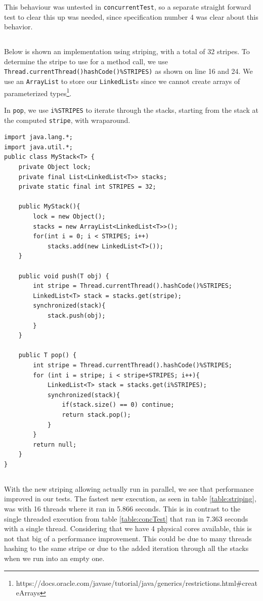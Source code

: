 \documentclass[a5paper]{article}
\begin{document}
This behaviour was untested in \texttt{concurrentTest}, so a separate straight forward test to clear this up was needed, since specification number 4 was clear about this behavior.

\subsection{}\label{sec:striping}
Below is shown an implementation using striping, with a total of 32 stripes. To determine the stripe to use for a method call, we use \texttt{Thread.currentThread()hashCode()\%STRIPES)}
as shown on line 16 and 24. We use an \texttt{ArrayList} to store our \texttt{LinkedList}s since we cannot create arrays of 
parameterized types\footnote{https://docs.oracle.com/javase/tutorial/java/generics/restrictions.html\#createArrays}.

In \texttt{pop}, we use \texttt{i\%STRIPES} to iterate through the stacks, starting from the stack at the computed \texttt{stripe}, with wraparound.

\begin{lstlisting}
import java.lang.*;
import java.util.*;
public class MyStack<T> {
    private Object lock;
    private final List<LinkedList<T>> stacks;
    private static final int STRIPES = 32;

    public MyStack(){
        lock = new Object();
        stacks = new ArrayList<LinkedList<T>>();
        for(int i = 0; i < STRIPES; i++)
            stacks.add(new LinkedList<T>());
    }

    public void push(T obj) {
        int stripe = Thread.currentThread().hashCode()%STRIPES;
        LinkedList<T> stack = stacks.get(stripe);
        synchronized(stack){
            stack.push(obj);
        }
    }

    public T pop() {
        int stripe = Thread.currentThread().hashCode()%STRIPES;
        for (int i = stripe; i < stripe+STRIPES; i++){
            LinkedList<T> stack = stacks.get(i%STRIPES);
            synchronized(stack){
                if(stack.size() == 0) continue;
                return stack.pop();
            }
        }
        return null;
    }
}
\end{lstlisting}

\subsection{}
With the new striping allowing actually run in parallel, we see that performance improved in our tests.
The fastest new execution, as seen in table \ref{table:striping}, was with 16 threads where it ran in 5.866 seconds. This is in contrast
to the single threaded execution from table \ref{table:concTest} that ran in 7.363 seconds with a single thread. Considering that we have
4 physical cores available, this is not that big of a performance improvement. This could be due to many threads hashing to the same stripe or
due to the added iteration through all the stacks when we run into an empty one.
\end{document}

